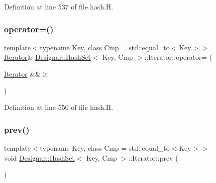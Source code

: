 Definition at line 537 of file hash.\+H.

\mbox{\label{class_designar_1_1_hash_set_1_1_iterator_a5856c1a7f46a0c4e2899acff687fdf13}} 
\subsubsection{\texorpdfstring{operator=()}{operator=()}\hspace{0.1cm}{\footnotesize\ttfamily [2/2]}}
{\footnotesize\ttfamily template$<$typename Key, class Cmp = std\+::equal\+\_\+to$<$\+Key$>$$>$ \\
\hyperlink{class_designar_1_1_hash_set_1_1_iterator}{Iterator}\& \hyperlink{class_designar_1_1_hash_set}{Designar\+::\+Hash\+Set}$<$ Key, Cmp $>$\+::Iterator\+::operator= (\begin{DoxyParamCaption}\item[{\hyperlink{class_designar_1_1_hash_set_1_1_iterator}{Iterator} \&\&}]{it }\end{DoxyParamCaption})\hspace{0.3cm}{\ttfamily [inline]}}



Definition at line 550 of file hash.\+H.

\mbox{\label{class_designar_1_1_hash_set_1_1_iterator_a678b8d6f21627b05cbde7d11da64a010}} 
\subsubsection{\texorpdfstring{prev()}{prev()}}
{\footnotesize\ttfamily template$<$typename Key, class Cmp = std\+::equal\+\_\+to$<$\+Key$>$$>$ \\
void \hyperlink{class_designar_1_1_hash_set}{Designar\+::\+Hash\+Set}$<$ Key, Cmp $>$\+::Iterator\+::prev (\begin{DoxyParamCaption}{ }\end{DoxyParamCaption})\hspace{0.3cm}{\ttfamily [inline]}}



